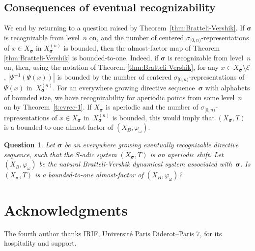 \documentclass{amsart}
\newtheorem{conjecture}[lemma]{Question}
\theoremstyle{definition}
\theoremstyle{remark}
\numberwithin{equation}{section}
\begin{document}
 \subsection{Consequences of eventual recognizability}
We end by returning to a question raised by Theorem~\ref{thm:Bratteli-Vershik}.
If $\boldsymbol{\sigma}$ is recognizable from level~$n$ on, and the number of centered $\sigma_{[0,n)}$-representations of $x \in X_{\boldsymbol{\sigma}}$ in $X_{\boldsymbol{\sigma}}^{(n)}$ is bounded, then the almost-factor map of Theorem \ref{thm:Bratteli-Vershik}
 is bounded-to-one. 
Indeed, if $\boldsymbol{\sigma}$ is recognizable from level~$n$ on, then, using the notation of Theorem \ref{thm:Bratteli-Vershik}, for any $x \in X_{\boldsymbol{\sigma}} \setminus \mathcal{E}$, $|\Psi^{-1}(\Psi(x))|$ is bounded by the number of centered $\sigma_{[0,n)}$-representations of $\Psi(x)$ in~$X_{\boldsymbol{\sigma}}^{(n)}$.
For an everywhere growing directive sequence~$\boldsymbol{\sigma}$ with alphabets of bounded size, we have recognizability for aperiodic points from some level~$n$ on by Theorem~\ref{t:evrec-1}.
If $X_{\boldsymbol{\sigma}}$ is aperiodic and the number of $\sigma_{[0,n)}$-representations of $x \in X_{\boldsymbol{\sigma}}$ in~$X_{\boldsymbol{\sigma}}^{(n)}$ is bounded, this would imply that $(X_{\boldsymbol{\sigma}},T)$ is a bounded-to-one almost-factor of $(X_B, \varphi_\omega)$. 

\begin{conjecture}
Let $\boldsymbol{\sigma}$ be an everywhere growing eventually recognizable directive sequence,  such that  the $S$-adic  system $(X_{\boldsymbol{\sigma}}, T)$ is an aperiodic shift. 
Let $(X_B, \varphi_\omega)$  be the natural Bratteli-Vershik dynamical system associated with~$\boldsymbol{\sigma}$. 
Is $(X_{\boldsymbol{\sigma}},T)$ is a bounded-to-one almost-factor of $(X_B, \varphi_\omega)$?
\end{conjecture} 

\section*{Acknowledgments}
The fourth author thanks IRIF, Universit\'e Paris Diderot--Paris 7, for its hospitality and support.



\end{document}
